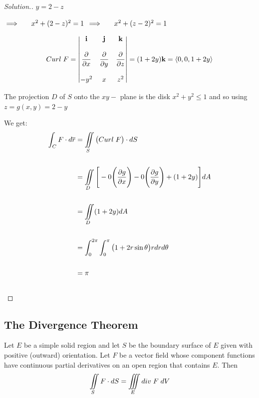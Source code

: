 \documentclass[11pt,a4paper]{article}
\theoremstyle{definition}
\newenvironment{solution}
  {\renewcommand{\qedsymbol}{}\begin{proof}[\textit{Solution}.]}
  {\end{proof}}
\begin{document}
\begin{solution}


$y = 2-z$


$\implies \hspace{0.5cm} x^2 + (2-z)^2 = 1$
$\implies \hspace{0.5cm} x^2 + (z-2)^2 = 1$


\begin{align*}
Curl \hspace{0.1cm} F & = \begin{vmatrix}
\textbf{i} & \textbf{j} & \textbf{k}\\\\
\dfrac{\partial}{\partial x} & \dfrac{\partial}{\partial y} & \dfrac{\partial}{\partial z}\\\\
-y^2 & x & z^2\\
\end{vmatrix}
 = (1 + 2y)\textbf{k} = \langle 0, 0, 1 + 2y\rangle\\
\end{align*}

The projection $D$ of $S$ onto the $xy-$ plane is the disk $x^2 + y^2 \leq 1$ and so using $z = g(x,y) = 2 -y$


We get:
\begin{align*}
\int_C F\cdot d \overline{r} & = \iint\limits_S\big( Curl\hspace{0.1cm}F\big)\cdot dS\\\\
& = \iint\limits_D \Bigg[-0 \Bigg(\dfrac{\partial g}{\partial x}\Bigg) - 0\Bigg(\dfrac{\partial g}{\partial y}\Bigg) + (1 + 2y)\Bigg]dA\\\\
& = \iint\limits_D (1 + 2y)dA\\\\
& = \int^{2\pi}_0\int^{\pi}_0\big( 1 + 2r\sin \theta \big) r dr d\theta\\\\
& = \pi\\\\
\end{align*}
\end{solution}

{\color[wave]{485}\subsection{The Divergence Theorem}}
Let $E$ be a simple solid region and let $S$ be the boundary surface of $E$ given with positive (outward) orientation. Let $F$ be a vector field whose component functions have continuous partial derivatives on an open region that contains $E$. Then $$\iint\limits_S F\cdot dS = \iiint\limits_E div\hspace{0.1cm}F\hspace{0.1cm}dV$$
\end{document}
